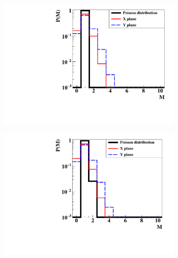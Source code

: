 \documentclass[a4paper,11pt]{article}
\begin{document}
\begin{figure}[htb]
\centering
    \begin{subfigure}{0.32\textwidth} \centering \includegraphics[width=\textwidth]{figures/Involved_fibers_17kHz_without_X=0.pdf} \caption{} \label{fig:Fibers_17kHz}
    \end{subfigure}
    \begin{subfigure}{0.32\textwidth} \centering \includegraphics[width=\textwidth]{figures/Involved_fibers_1MHz_without_X=0.pdf} \caption{} \label{fig:Fibers_1MHz}
    \end{subfigure}

\end{figure}
\end{document}
